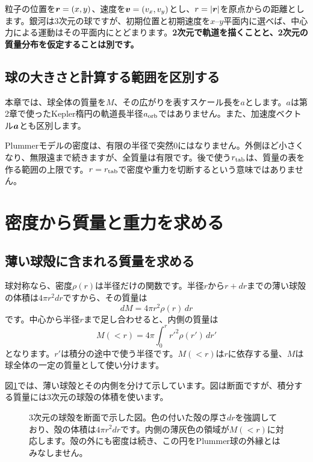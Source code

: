 粒子の位置を$\boldsymbol r=(x,y)$、速度を$\boldsymbol v=(v_x,v_y)$とし、$r=|\boldsymbol r|$を原点からの距離とします。銀河は3次元の球ですが、初期位置と初期速度を$x$--$y$平面内に選べば、中心力による運動はその平面内にとどまります。\textbf{2次元で軌道を描くことと、2次元の質量分布を仮定することは別です。}\nobreak\cite{bt2008}

\subsection{球の大きさと計算する範囲を区別する}
本章では、球全体の質量を$M$、その広がりを表すスケール長を$a$とします。$a$は第2章で使ったKepler楕円の軌道長半径$a_{\rm orb}$ではありません。また、加速度ベクトル$\boldsymbol a$とも区別します。

Plummerモデルの密度は、有限の半径で突然0にはなりません。外側ほど小さくなり、無限遠まで続きますが、全質量は有限です。後で使う$r_{\rm tab}$は、質量の表を作る範囲の上限です。$r=r_{\rm tab}$で密度や重力を切断するという意味ではありません。

\section{密度から質量と重力を求める}
\label{sec:ch3-spherical}
\subsection{薄い球殻に含まれる質量を求める}
球対称なら、密度$\rho(r)$は半径だけの関数です。半径$r$から$r+dr$までの薄い球殻の体積は$4\pi r^2dr$ですから、その質量は
\begin{equation}
 dM=4\pi r^2\rho(r)\,dr
 \label{eq:ch3-shell}
\end{equation}
です。中心から半径$r$まで足し合わせると、内側の質量は
\begin{equation}
 M(<r)=4\pi\int_0^r r'^2\rho(r')\,dr'
 \label{eq:ch3-enclosed-general}
\end{equation}
となります。$r'$は積分の途中で使う半径です。$M(<r)$は$r$に依存する量、$M$は球全体の一定の質量として使い分けます。


図\ref{fig:concept-ch3-shell}では、薄い球殻とその内側を分けて示しています。図は断面ですが、積分する質量には3次元の球殻の体積を使います。
\begin{figure}[!htbp]
\centering

\caption{3次元の球殻を断面で示した図。色の付いた殻の厚さ$dr$を強調しており、殻の体積は$4\pi r^2dr$です。内側の薄灰色の領域が$M(<r)$に対応します。殻の外にも密度は続き、この円をPlummer球の外縁とはみなしません。}
\label{fig:concept-ch3-shell}
\end{figure}
\FloatBarrier

